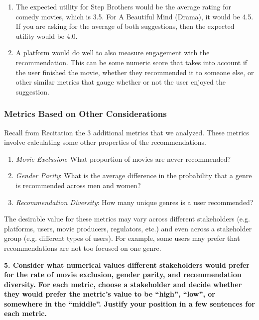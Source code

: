 \documentclass{article}
\begin{document}
\bigskip
\begin{mdframed}
\begin{enumerate}[label=\Alph*.]
\item The expected utility for Step Brothers would be the average rating for comedy movies, which is 3.5. For A Beautiful Mind (Drama), it would be 4.5. If you are asking for the average of both suggestions, then the expected utility would be 4.0.
\item A platform would do well to also measure engagement with the recommendation. This can be some numeric score that takes into account if the user finished the movie, whether they recommended it to someone else, or other similar metrics that gauge whether or not the user enjoyed the suggestion.
\end{enumerate}
\end{mdframed}
\bigskip

\subsubsection*{Metrics Based on Other Considerations}

Recall from Recitation the 3 additional metrics that we analyzed. These metrics involve calculating some other properties of the recommendations. 
\begin{enumerate}
    \item \textit{Movie Exclusion}: What proportion of movies are never recommended?
    \item \textit{Gender Parity}: What is the average difference in the probability that a genre is recommended across men and women?
    \item \textit{Recommendation Diversity}: How many unique genres is a user recommended?
\end{enumerate}

The desirable value for these metrics may vary across different stakeholders (e.g. platforms, users, movie producers, regulators, etc.) and even across a stakeholder group (e.g. different types of users). For example, some users may prefer that recommendations are not too focused on one genre. 

\bigskip

\textbf{5. Consider what numerical values different stakeholders would prefer for the rate of movie exclusion, gender parity, and recommendation diversity. For each metric, choose a stakeholder and decide whether they would prefer the metric's value to be ``high'', ``low'', or somewhere in the ``middle''. Justify your position in a few sentences for each metric.} 
\end{document}
